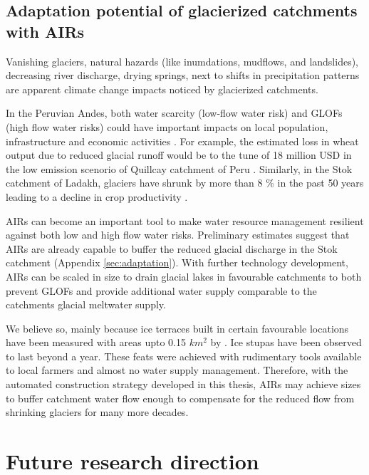 \subsection{Adaptation potential of glacierized catchments with AIRs}

Vanishing glaciers, natural hazards (like inumdations, mudflows, and landslides), decreasing river discharge,
drying springs, next to shifts in precipitation patterns are apparent climate change impacts noticed by
glacierized catchments.

In the Peruvian Andes, both water scarcity (low-flow water risk) and GLOFs (high flow water risks) could have
important impacts on local population, infrastructure and economic activities
\citep{motschmannIntegratedAssessmentsWater2020}. For example, the estimated loss in wheat output due to reduced
glacial runoff would be to the tune of 18 million USD in the low emission scenorio of Quillcay catchment of Peru
\citep{motschmannCurrentFutureWater2022}. Similarly, in the Stok catchment of Ladakh, glaciers have shrunk by
more than 8 \% in the past 50 years  leading to a decline in crop productivity
\citep{sohebMassbalanceObservationReconstruction2020}. 

AIRs can become an important tool to make water resource management resilient against both low and high flow
water risks. Preliminary estimates suggest that AIRs are already capable to buffer the reduced glacial discharge
in the Stok catchment (Appendix \ref{sec:adaptation}). With further technology development, AIRs can be scaled
in size to drain glacial lakes in favourable catchments to both prevent GLOFs and provide additional water
supply comparable to the catchments glacial meltwater supply.

We believe so, mainly because ice terraces built in certain favourable locations have been measured with areas
upto 0.15 $km^2$ by \citet{nusserSociohydrologyArtificialGlaciers2019}. Ice stupas have been observed to last
beyond a year. These feats were achieved with rudimentary tools available to local farmers and almost no water
supply management. Therefore, with the automated construction strategy developed in this thesis, AIRs may
achieve sizes to buffer catchment water flow enough to compensate for the reduced flow from shrinking glaciers
for many more decades.

\section{Future research direction}

